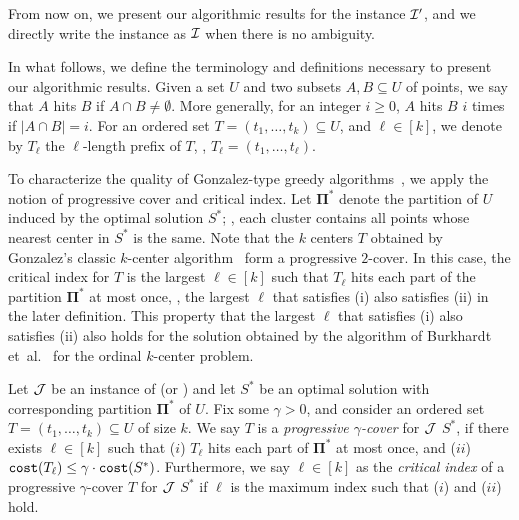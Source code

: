 \documentclass{article}
\begin{document}
From now on, we present our algorithmic results for the instance $\mathcal{I}'$, and we directly write the instance as $\mathcal{I}$ when there is no ambiguity.




In what follows, we define the terminology and definitions necessary to present our algorithmic results.
Given a  set $U$ and two subsets $A,B \subseteq U$ of points, we say that $A$ hits $B$ if $A \cap B \neq \emptyset$. More generally, for an integer $i \geq 0$, $A$ hits $B$ $i$ times if $|A \cap B|=i$. For an ordered set $T = (t_1,\dots,t_k) \subseteq U$, and $\ell \in [k]$, we denote by $T_\ell$ the $\ell$-length prefix of $T$, \ie, $T_\ell= (t_1,\dots, t_\ell)$.

To characterize the quality of Gonzalez-type greedy algorithms~\cite{gonzalez1985clustering, burkhardt2024low}, we apply the notion of progressive cover and critical index.
Let $\mathbf{\Pi}^*$ denote the partition of $U$ induced by the optimal solution $S^*$; \ie, each cluster contains all points whose nearest center in $S^*$ is the same.
Note that the $k$ centers $T$ obtained by Gonzalez's classic $k$-center algorithm~\cite{gonzalez1985clustering} form a progressive $2$-cover. 
In this case, the critical index for $T$ is the largest $\ell \in [k]$ such that $T_{\ell}$ hits each part of the partition $\mathbf{\Pi}^*$ at most once, \ie, the largest $\ell$ that satisfies (i) also satisfies (ii) in the later definition. 
This property that the largest $\ell$ that satisfies (i) also satisfies (ii) also holds for the solution obtained by the algorithm of Burkhardt et~al.~\cite{burkhardt2024low} for the ordinal $k$-center problem.

\begin{definition}
Let $\mathcal{J}$ be an instance of \kcenter (or \fairkcenter) and let $S^*$ be an optimal solution with corresponding partition $\mathbf{\Pi}^*$ of $U$. Fix some $\gamma >0$, and consider an ordered set $T=(t_1,\dots,t_k) \subseteq U$ of size $k$. We say $T$ is a \emph{progressive $\gamma$-cover} for $\mathcal{J}$ \wrt $S^*$, if there exists $\ell \in [k]$ such that ($i$) $T_{\ell}$ hits each part of $\mathbf{\Pi}^*$ at most once, and ($ii$) $\texttt{cost}(T_{\ell}) \leq \gamma\cdot \texttt{cost}(S^*)$. Furthermore, we say $\ell \in [k]$ as the \emph{critical index} of a progressive $\gamma$-cover $T$ for $\mathcal{J}$  \wrt $S^*$ if $\ell$ is the maximum index such that ($i$) and ($ii$) hold.
\end{definition}
\end{document}

